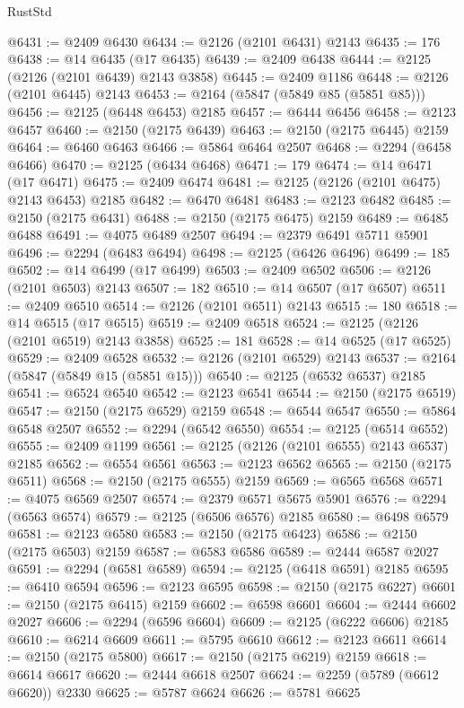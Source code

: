 \begin{lexlean}{RustStd}
\begin{coremodule}
@6431 := @2409 @6430
@6434 := @2126 (@2101 @6431) @2143
@6435 := 176
@6438 := @14 @6435 (@17 @6435)
@6439 := @2409 @6438
@6444 := @2125 (@2126 (@2101 @6439) @2143 @3858)
@6445 := @2409 @1186
@6448 := @2126 (@2101 @6445) @2143
@6453 := @2164 (@5847 (@5849 @85 (@5851 @85)))
@6456 := @2125 (@6448 @6453) @2185
@6457 := @6444 @6456
@6458 := @2123 @6457
@6460 := @2150 (@2175 @6439)
@6463 := @2150 (@2175 @6445) @2159
@6464 := @6460 @6463
@6466 := @5864 @6464 @2507
@6468 := @2294 (@6458 @6466)
@6470 := @2125 (@6434 @6468)
@6471 := 179
@6474 := @14 @6471 (@17 @6471)
@6475 := @2409 @6474
@6481 := @2125 (@2126 (@2101 @6475) @2143 @6453) @2185
@6482 := @6470 @6481
@6483 := @2123 @6482
@6485 := @2150 (@2175 @6431)
@6488 := @2150 (@2175 @6475) @2159
@6489 := @6485 @6488
@6491 := @4075 @6489 @2507
@6494 := @2379 @6491 @5711 @5901
@6496 := @2294 (@6483 @6494)
@6498 := @2125 (@6426 @6496)
@6499 := 185
@6502 := @14 @6499 (@17 @6499)
@6503 := @2409 @6502
@6506 := @2126 (@2101 @6503) @2143
@6507 := 182
@6510 := @14 @6507 (@17 @6507)
@6511 := @2409 @6510
@6514 := @2126 (@2101 @6511) @2143
@6515 := 180
@6518 := @14 @6515 (@17 @6515)
@6519 := @2409 @6518
@6524 := @2125 (@2126 (@2101 @6519) @2143 @3858)
@6525 := 181
@6528 := @14 @6525 (@17 @6525)
@6529 := @2409 @6528
@6532 := @2126 (@2101 @6529) @2143
@6537 := @2164 (@5847 (@5849 @15 (@5851 @15)))
@6540 := @2125 (@6532 @6537) @2185
@6541 := @6524 @6540
@6542 := @2123 @6541
@6544 := @2150 (@2175 @6519)
@6547 := @2150 (@2175 @6529) @2159
@6548 := @6544 @6547
@6550 := @5864 @6548 @2507
@6552 := @2294 (@6542 @6550)
@6554 := @2125 (@6514 @6552)
@6555 := @2409 @1199
@6561 := @2125 (@2126 (@2101 @6555) @2143 @6537) @2185
@6562 := @6554 @6561
@6563 := @2123 @6562
@6565 := @2150 (@2175 @6511)
@6568 := @2150 (@2175 @6555) @2159
@6569 := @6565 @6568
@6571 := @4075 @6569 @2507
@6574 := @2379 @6571 @5675 @5901
@6576 := @2294 (@6563 @6574)
@6579 := @2125 (@6506 @6576) @2185
@6580 := @6498 @6579
@6581 := @2123 @6580
@6583 := @2150 (@2175 @6423)
@6586 := @2150 (@2175 @6503) @2159
@6587 := @6583 @6586
@6589 := @2444 @6587 @2027
@6591 := @2294 (@6581 @6589)
@6594 := @2125 (@6418 @6591) @2185
@6595 := @6410 @6594
@6596 := @2123 @6595
@6598 := @2150 (@2175 @6227)
@6601 := @2150 (@2175 @6415) @2159
@6602 := @6598 @6601
@6604 := @2444 @6602 @2027
@6606 := @2294 (@6596 @6604)
@6609 := @2125 (@6222 @6606) @2185
@6610 := @6214 @6609
@6611 := @5795 @6610
@6612 := @2123 @6611
@6614 := @2150 (@2175 @5800)
@6617 := @2150 (@2175 @6219) @2159
@6618 := @6614 @6617
@6620 := @2444 @6618 @2507
@6624 := @2259 (@5789 (@6612 @6620)) @2330
@6625 := @5787 @6624
@6626 := @5781 @6625

\end{coremodule}
\end{lexlean}
